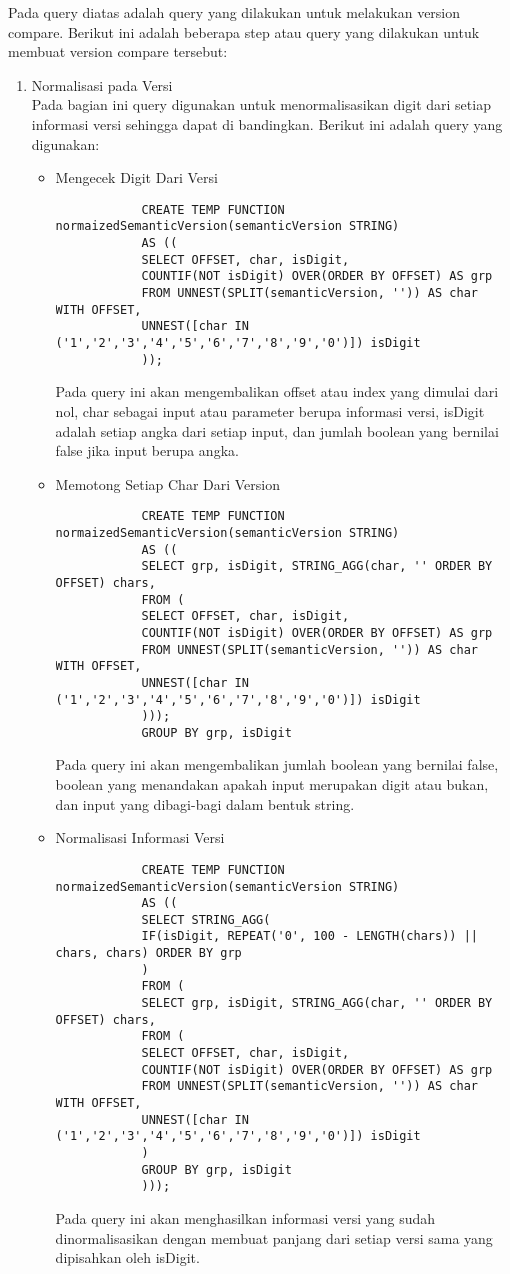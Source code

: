 Pada query diatas adalah query yang dilakukan untuk melakukan version compare. Berikut ini adalah beberapa step atau query yang dilakukan untuk membuat version compare tersebut:
\begin{enumerate}
	\item Normalisasi pada Versi\\
	Pada bagian ini query digunakan untuk menormalisasikan digit dari setiap informasi versi sehingga dapat di bandingkan. Berikut ini adalah query yang digunakan:
	\begin{itemize}
		\item  Mengecek Digit Dari Versi
		\begin{lstlisting}
			CREATE TEMP FUNCTION normaizedSemanticVersion(semanticVersion STRING) 
			AS ((
			SELECT OFFSET, char, isDigit,
			COUNTIF(NOT isDigit) OVER(ORDER BY OFFSET) AS grp
			FROM UNNEST(SPLIT(semanticVersion, '')) AS char WITH OFFSET, 
			UNNEST([char IN ('1','2','3','4','5','6','7','8','9','0')]) isDigit
			));
		\end{lstlisting}
		Pada query ini akan mengembalikan offset atau index yang dimulai dari nol, char sebagai input atau parameter berupa informasi versi, isDigit adalah setiap angka dari setiap input, dan jumlah boolean yang bernilai false jika input berupa angka. 
		
		\item Memotong Setiap Char Dari Version
		\begin{lstlisting}
			CREATE TEMP FUNCTION normaizedSemanticVersion(semanticVersion STRING) 
			AS ((
			SELECT grp, isDigit, STRING_AGG(char, '' ORDER BY OFFSET) chars,
			FROM (
			SELECT OFFSET, char, isDigit,
			COUNTIF(NOT isDigit) OVER(ORDER BY OFFSET) AS grp
			FROM UNNEST(SPLIT(semanticVersion, '')) AS char WITH OFFSET, 
			UNNEST([char IN ('1','2','3','4','5','6','7','8','9','0')]) isDigit
			)));
			GROUP BY grp, isDigit
		\end{lstlisting}
		Pada query ini akan mengembalikan jumlah boolean yang bernilai false, boolean yang menandakan apakah input merupakan digit atau bukan, dan input yang dibagi-bagi dalam bentuk string.
		
		\item Normalisasi Informasi Versi
		\begin{lstlisting}
			CREATE TEMP FUNCTION normaizedSemanticVersion(semanticVersion STRING) 
			AS ((
			SELECT STRING_AGG(
			IF(isDigit, REPEAT('0', 100 - LENGTH(chars)) || chars, chars) ORDER BY grp 
			)
			FROM (
			SELECT grp, isDigit, STRING_AGG(char, '' ORDER BY OFFSET) chars,
			FROM (
			SELECT OFFSET, char, isDigit,
			COUNTIF(NOT isDigit) OVER(ORDER BY OFFSET) AS grp
			FROM UNNEST(SPLIT(semanticVersion, '')) AS char WITH OFFSET, 
			UNNEST([char IN ('1','2','3','4','5','6','7','8','9','0')]) isDigit
			)
			GROUP BY grp, isDigit
			)));
		\end{lstlisting}
		Pada query ini akan menghasilkan informasi versi yang sudah dinormalisasikan dengan membuat panjang dari setiap versi sama yang dipisahkan oleh isDigit.
		

\end{itemize}
\end{enumerate}
